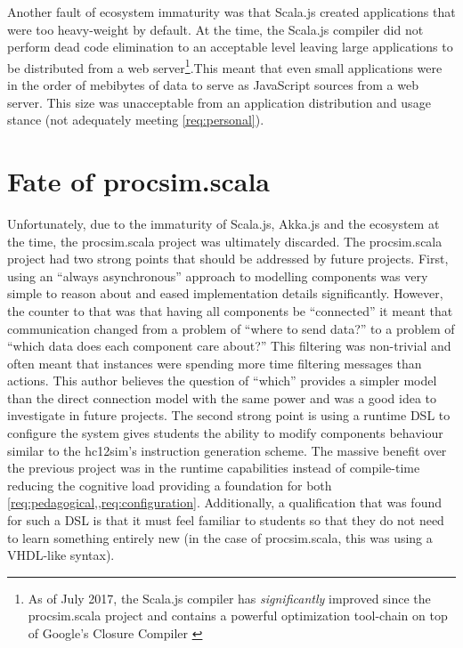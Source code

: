 Another fault of ecosystem immaturity was that Scala.js created applications that were too heavy-weight by default. At the time, the Scala.js compiler did not perform dead code elimination to an acceptable level leaving large applications to be distributed from a web server\footnote{As of July 2017, the Scala.js compiler has \textit{significantly} improved since the procsim.scala project and contains a powerful optimization tool-chain on top of Google's Closure Compiler \cite{Scala-js:CompOptPipeline}}.This meant that even small applications were in the order of mebibytes of data to serve as JavaScript sources from a web server. This size was unacceptable from an application distribution and usage stance (not adequately meeting \cref{req:personal}). 

\section{Fate of procsim.scala}

Unfortunately, due to the immaturity of Scala.js, Akka.js and the ecosystem at the time, the procsim.scala project was ultimately discarded. The procsim.scala project had two strong points that should be addressed by future projects. First, using an ``always asynchronous'' approach to modelling components was very simple to reason about and eased implementation details significantly. However, the counter to that was that having all components be ``connected'' it meant that communication changed from a problem of ``where to send data?'' to a problem of ``which data does each component care about?'' This filtering was non-trivial and often meant that \akkaActor{} instances were spending more time filtering messages than actions. This author believes the question of ``which'' provides a simpler model than the direct connection model with the same power and was a good idea to investigate in future projects. The second strong point is using a runtime DSL to configure the system gives students the ability to modify components behaviour similar to the hc12sim's instruction generation scheme. The massive benefit over the previous project was in the runtime capabilities instead of compile-time reducing the cognitive load providing a foundation for both \cref{req:pedagogical,,req:configuration}. Additionally, a qualification that was found for such a DSL is that it must feel familiar to students so that they do not need to learn something entirely new (in the case of procsim.scala, this was using a VHDL-like syntax). 

